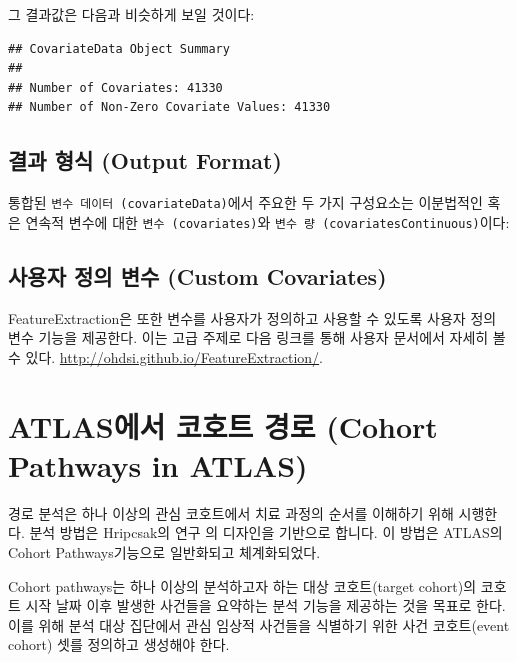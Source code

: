 \documentclass[11pt]{book}
\newenvironment{Shaded}{\begin{snugshade}}{\end{snugshade}}
\newcommand{\OperatorTok}[1]{\textcolor[rgb]{0.81,0.36,0.00}{\textbf{#1}}}
\newcommand{\NormalTok}[1]{#1}
\theoremstyle{definition}
\theoremstyle{definition}
\theoremstyle{definition}
\theoremstyle{remark}
\begin{document}
그 결과값은 다음과 비슷하게 보일 것이다:

\begin{verbatim}
## CovariateData Object Summary 
## 
## Number of Covariates: 41330 
## Number of Non-Zero Covariate Values: 41330
\end{verbatim}

\subsection{결과 형식 (Output Format)}\label{--output-format}

통합된 \texttt{변수\ 데이터\ (covariateData)}에서 주요한 두 가지
구성요소는 이분법적인 혹은 연속적 변수에 대한
\texttt{변수\ (covariates)}와
\texttt{변수\ 량\ (covariatesContinuous)}이다:

\begin{Shaded}
\end{Shaded}

\subsection{사용자 정의 변수 (Custom
Covariates)}\label{---custom-covariates}

FeatureExtraction은 또한 변수를 사용자가 정의하고 사용할 수 있도록
사용자 정의 변수 기능을 제공한다. 이는 고급 주제로 다음 링크를 통해
사용자 문서에서 자세히 볼 수 있다.
\url{http://ohdsi.github.io/FeatureExtraction/}.

\section{ATLAS에서 코호트 경로 (Cohort Pathways in
ATLAS)}\label{atlas---cohort-pathways-in-atlas}

경로 분석은 하나 이상의 관심 코호트에서 치료 과정의 순서를 이해하기 위해
시행한다. 분석 방법은 Hripcsak의 연구 \citep{Hripcsak7329} 의 디자인을
기반으로 합니다. 이 방법은 ATLAS의 Cohort Pathways기능으로 일반화되고
체계화되었다.

Cohort pathways는 하나 이상의 분석하고자 하는 대상 코호트(target
cohort)의 코호트 시작 날짜 이후 발생한 사건들을 요약하는 분석 기능을
제공하는 것을 목표로 한다. 이를 위해 분석 대상 집단에서 관심 임상적
사건들을 식별하기 위한 사건 코호트(event cohort) 셋를 정의하고 생성해야
한다.
\end{document}
